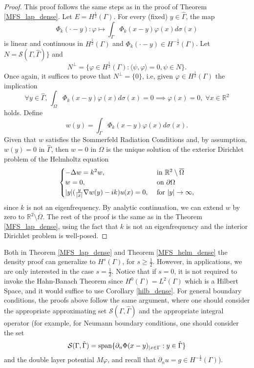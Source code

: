 \begin{proof}
    This proof follows the same steps as in the proof of Theorem \ref{MFS_lap_dense}. Let \(E = H^\frac{1}{2}(\Gamma)\). For every (fixed) \(y \in \hat{\Gamma}\), the map
    \[
        \Phi_k(\cdot-y): \varphi \mapsto \int_\Gamma \Phi_k(x-y)\varphi(x)d\sigma(x)
    \]
    is linear and continuous in \(H^\frac{1}{2}(\Gamma)\) and \(\Phi_k(\cdot-y) \in H^{-\frac{1}{2}}(\Gamma)\). Let \(N = \mathcal{S}(\Gamma, \hat{\Gamma})\}\) and
    \[
        N^\perp = \{\varphi \in H^\frac{1}{2}(\Gamma): \langle \psi, \varphi \rangle = 0, \psi \in N\}.
    \]
    Once again, it suffices to prove that \(N^\perp = \{0\}\), i.e, given \(\varphi \in H^\frac{1}{2}(\Gamma)\) the implication
    \[
        \forall y \in \hat{\Gamma}, \, \int_\Omega \Phi_k(x-y)\varphi(x)d\sigma(x) = 0 \implies \varphi(x) = 0, \; \forall x \in \mathbb{R}^2
    \]
    holds. Define
    \[
        w(y) = \int_\Gamma \Phi_k(x-y)\varphi(x)d\sigma(x).
    \]
    Given that \(w\) satisfies the Sommerfeld Radiation Conditions and, by assumption, \(w(y) = 0\) in \(\hat{\Gamma}\), then \(w = 0\) in \(\Omega\) is the unique solution of the exterior Dirichlet problem of the Helmholtz equation
    \[
        \begin{cases}
            -\Delta w = k^2 w, & \text{ in } \mathbb{R}^2\setminus \overline{\Omega}\\
            w = 0, & \text{ on } \partial \Omega\\
            \abs{y} (\frac{y}{\abs{x}}\nabla w(y) - i k)u(x) = 0, & \text{ for } \abs{y} \rightarrow \infty,
        \end{cases}
    \]
    since \(k\) is not an eigenfrequency. By analytic continuation, we can extend \(w\) by zero to \(\mathbb{R}^2\setminus \overline{\Omega}\). The rest of the proof is the same as in the Theorem \ref{MFS_lap_dense}, using the fact that \(k\) is not an eigenfrequency and the interior Dirichlet problem is well-posed.
\end{proof}
\begin{remark}\label{density_remark_general_bc_and_hilbert}
    Both in Theorem \ref{MFS_lap_dense} and Theorem \ref{MFS_helm_dense} the density proof can generalize to \(H^s(\Gamma)\), for \(s \geq \frac{1}{2}\). However, in applications, we are only interested in the case \(s=\frac{1}{2}\). Notice that if \(s=0\), it is not required to invoke the Hahn-Banach Theorem since \(H^0(\Gamma)=L^2(\Gamma)\) which is a Hilbert Space, and it would suffice to use Corollary \eqref{hilb_dense}. For general boundary conditions, the proofs above follow the same argument, where one should consider the appropriate approximating set \(\mathcal{S}(\Gamma, \hat{\Gamma})\) and the appropriate integral operator (for example, for Neumann boundary conditions, one should consider the set
    \[
        \mathcal{S}(\Gamma, \hat{\Gamma}) = \operatorname{span}\{\partial_n \Phi(x-y)_{|x \in \Gamma} : y \in \hat{\Gamma}\}
    \]
    and the double layer potential \(M\varphi\), and recall that \(\partial_n u = g \in H^{-\frac{1}{2}}(\Gamma)\)).
\end{remark}
